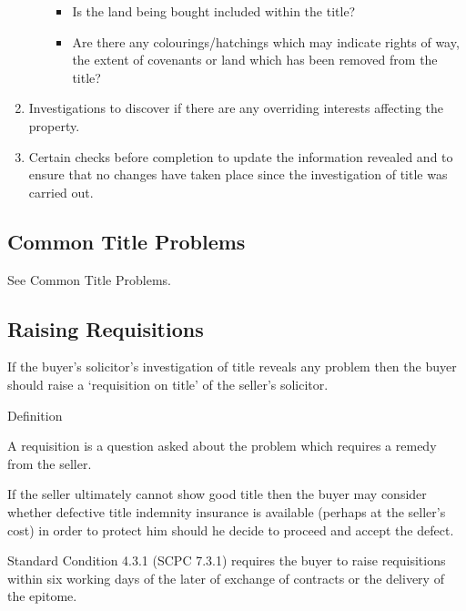 \documentclass[
]{article}
\providecommand{\tightlist}{%
  \setlength{\itemsep}{0pt}\setlength{\parskip}{0pt}}
\newenvironment{env-68b88379-d4cc-4b35-9b80-2115e064fa9f}
{
    \savenotes\tcolorbox[blanker,breakable,left=5pt,borderline west={2pt}{-4pt}{gold}]
}
{
    \endtcolorbox\spewnotes
}
\begin{document}
\begin{enumerate}
\begin{itemize}
    \begin{itemize}
    \tightlist
    \item
      Is the land being bought included within the title?
    \item
      Are there any colourings/hatchings which may indicate rights of
      way, the extent of covenants or land which has been removed from
      the title?
    \end{itemize}
  \end{itemize}
\item
  Investigations to discover if there are any overriding interests
  affecting the property.
\item
  Certain checks before completion to update the information revealed
  and to ensure that no changes have taken place since the investigation
  of title was carried out.
\end{enumerate}

\hypertarget{common-title-problems}{%
\subsection{Common Title Problems}\label{common-title-problems}}

See Common Title Problems.

\hypertarget{raising-requisitions}{%
\subsection{Raising Requisitions}\label{raising-requisitions}}

If the buyer's solicitor's investigation of title reveals any problem
then the buyer should raise a `requisition on title' of the seller's
solicitor.

\begin{env-68b88379-d4cc-4b35-9b80-2115e064fa9f}

Definition

A requisition is a question asked about the problem which requires a
remedy from the seller.

\end{env-68b88379-d4cc-4b35-9b80-2115e064fa9f}

If the seller ultimately cannot show good title then the buyer may
consider whether defective title indemnity insurance is available
(perhaps at the seller's cost) in order to protect him should he decide
to proceed and accept the defect.

Standard Condition 4.3.1 (SCPC 7.3.1) requires the buyer to raise
requisitions within six working days of the later of exchange of
contracts or the delivery of the epitome.
\end{document}
